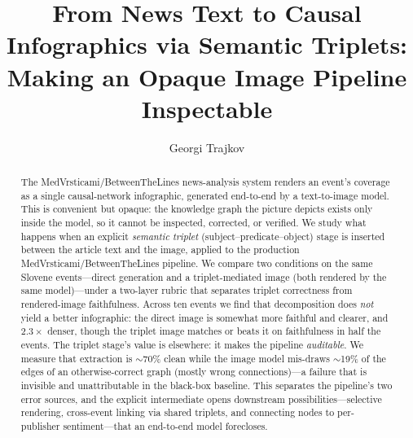 \documentclass[sigconf,natbib=false, language=english]{acmart}
\begin{document}
\title[From News Text to Causal Infographics via Semantic Triplets]{From News Text to Causal Infographics via Semantic Triplets: Making an Opaque Image Pipeline Inspectable}

\author{Georgi Trajkov}

\begin{abstract}
The MedVrsticami/BetweenTheLines news-analysis system renders an event's coverage as a single causal-network infographic, generated end-to-end by a text-to-image model. This is convenient but opaque: the knowledge graph the picture depicts exists only inside the model, so it cannot be inspected, corrected, or verified. We study what happens when an explicit \emph{semantic triplet} (subject--predicate--object) stage is inserted between the article text and the image, applied to the production MedVrsticami/BetweenTheLines pipeline. We compare two conditions on the same Slovene events---direct generation and a triplet-mediated image (both rendered by the same model)---under a two-layer rubric that separates triplet correctness from rendered-image faithfulness. Across ten events we find that decomposition does \emph{not} yield a better infographic: the direct image is somewhat more faithful and clearer, and $2.3\times$ denser, though the triplet image matches or beats it on faithfulness in half the events. The triplet stage's value is elsewhere: it makes the pipeline \emph{auditable}. We measure that extraction is $\sim$70\% clean while the image model mis-draws $\sim$19\% of the edges of an otherwise-correct graph (mostly wrong connections)---a failure that is invisible and unattributable in the black-box baseline. This separates the pipeline's two error sources, and the explicit intermediate opens downstream possibilities---selective rendering, cross-event linking via shared triplets, and connecting nodes to per-publisher sentiment---that an end-to-end model forecloses.
\end{abstract}


\maketitle
\end{document}
